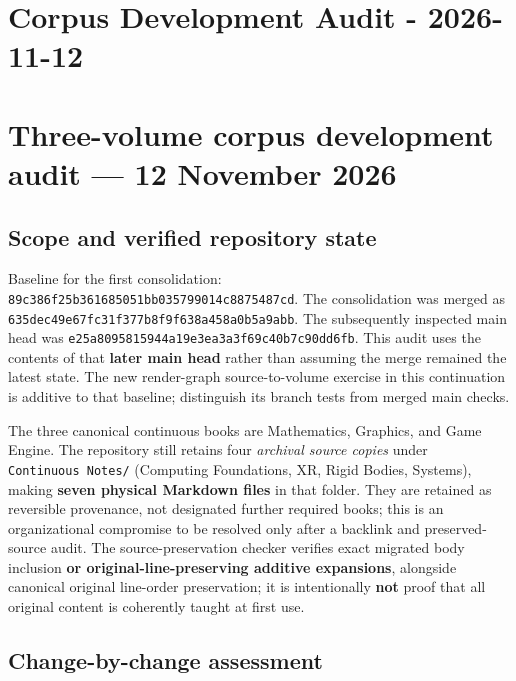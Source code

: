 \hypertarget{appendix-28e6f216fdc7}{}
\section*{Corpus Development Audit - 2026-11-12}
\section{Three-volume corpus development audit --- 12 November 2026}\label{three-volume-corpus-development-audit-12-november-2026}

\subsection{Scope and verified repository state}\label{scope-and-verified-repository-state}

Baseline for the first consolidation: \texttt{89c386f25b361685051bb035799014c8875487cd}. The consolidation was merged as \texttt{635dec49e67fc31f377b8f9f638a458a0b5a9abb}. The subsequently inspected main head was \texttt{e25a8095815944a19e3ea3a3f69c40b7c90dd6fb}. This audit uses the contents of that \textbf{later main head} rather than assuming the merge remained the latest state. The new render-graph source-to-volume exercise in this continuation is additive to that baseline; distinguish its branch tests from merged main checks.

The three canonical continuous books are Mathematics, Graphics, and Game Engine. The repository still retains four \emph{archival source copies} under \texttt{Continuous\ Notes/} (Computing Foundations, XR, Rigid Bodies, Systems), making \textbf{seven physical Markdown files} in that folder. They are retained as reversible provenance, not designated further required books; this is an organizational compromise to be resolved only after a backlink and preserved-source audit. The source-preservation checker verifies exact migrated body inclusion \textbf{or original-line-preserving additive expansions}, alongside canonical original line-order preservation; it is intentionally \textbf{not} proof that all original content is coherently taught at first use.

\subsection{Change-by-change assessment}\label{change-by-change-assessment}

